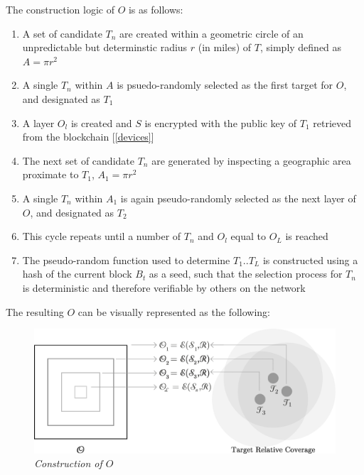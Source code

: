 \documentclass[letterpaper,11pt]{article}
\begin{document}
The construction logic of $\mathit{O}$ is as follows:

\begin{enumerate}
  \item A set of candidate $\mathit{T_n}$ are created within a geometric circle of an unpredictable but determinstic radius $\mathit{r}$ (in miles) of $\mathit{T}$, simply defined as $\mathit{A = \pi r^2}$
  \item A single $\mathit{T_n}$ within $\mathit{A}$ is psuedo-randomly selected as the first target for $\mathit{O}$, and designated as $\mathit{T_1}$
  \item A layer $\mathit{O_l}$ is created and $\mathit{S}$ is encrypted with the public key of $\mathit{T_1}$ retrieved from the blockchain [\ref{devices}]
  \item The next set of candidate $\mathit{T_n}$ are generated by inspecting a geographic area proximate to $\mathit{T_1}$, $\mathit{A_1 = \pi r^2}$
  \item A single $\mathit{T_n}$ within $\mathit{A_1}$ is again pseudo-randomly selected as the next layer of $\mathit{O}$, and designated as $\mathit{T_2}$
  \item This cycle repeats until a number of $\mathit{T_n}$ and $\mathit{O_l}$ equal to $\mathit{O_L}$ is reached
  \item The pseudo-random function used to determine $\mathit{T_1}$..$\mathit{T_L}$ is constructed using a hash of the current block $\mathit{B_t}$ as a seed, such that the selection process for $\mathit{T_n}$ is deterministic and therefore verifiable by others on the network
\end{enumerate}

The resulting $\mathit{O}$ can be visually represented as the following:\newline

\begin{figure}[H]
	\begin{center}
  		\includegraphics[width=\textwidth]{diagram3.eps}
  		\caption{\emph{Construction of $\mathit{O}$}}
  		\label{fig:onion-packet}
 	\end{center}
\end{figure}
\end{document}
